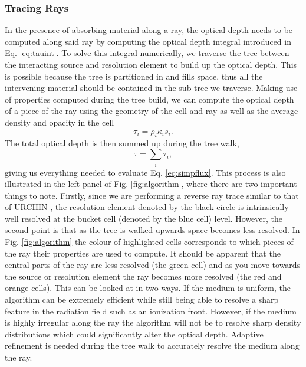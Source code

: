 \documentclass[fleq,usenatbib]{mnras}
\begin{document}
\subsubsection{Tracing Rays}
In the presence of absorbing material along a ray, the optical depth needs to 
be computed along said ray by computing the optical depth integral introduced 
in Eq. \ref{eq:tauint}. To solve this integral numerically, we traverse the 
tree between the interacting source and resolution element to build up the 
optical depth. This is possible because the tree is partitioned in and fills 
space, thus all the intervening material should be contained in the sub-tree 
we traverse. Making use of properties computed during the tree build, we can 
compute the optical depth of a piece of the ray using the geometry of the cell 
and ray as well as the average density and opacity in the cell
\begin{equation}
\label{eq:taui}
\tau_i = \bar{\rho}_i \bar{\kappa}_i s_i.
\end{equation}
The total optical depth is then summed up during the tree walk,
\begin{equation}
\label{eq:tausum}
\tau = \sum_i \tau_i,
\end{equation}
giving us everything needed to evaluate Eq. \ref{eq:simpflux}. This process 
is also illustrated in the left panel of Fig. \ref{fig:algorithm}, where there 
are two important things to note. Firstly, since we are performing a reverse 
ray trace similar to that of URCHIN \citep{altayTheuns13}, the resolution 
element denoted by the black circle is intrinsically well resolved at the 
bucket cell (denoted by the blue cell) level. However, the second point is 
that as the tree is walked upwards space becomes less resolved. In Fig. 
\ref{fig:algorithm} the colour of highlighted cells corresponds to which 
pieces of the ray their properties are used to compute. It should be apparent 
that the central parts of the ray are less resolved (the green cell) and as 
you move towards the source or resolution element the ray becomes more 
resolved (the red and orange cells). This can be looked at in two ways. 
If the medium is uniform, the algorithm can be extremely efficient 
while still being able to resolve a sharp feature in the radiation field such 
as an ionization front. However, if the medium is highly irregular along the 
ray the algorithm will not be to resolve sharp density distributions which 
could significantly alter the optical depth. Adaptive refinement is needed 
during the tree walk to accurately resolve the medium along the ray.
\end{document}
